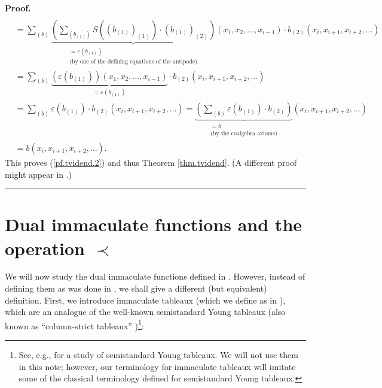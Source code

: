 \documentclass[numbers=enddot,12pt,final,onecolumn,notitlepage,abstracton]{scrartcl}%
\theoremstyle{definition}
\newenvironment{proof}[1][Proof]{\noindent\textbf{#1.} }{\ \rule{0.5em}{0.5em}}
\newenvironment{verlong}{}{}
\newenvironment{noncompile}{}{}
\let\sumnonlimits\sum
\renewcommand{\sum}{\sumnonlimits\limits}
\begin{document}
\begin{verlong}
\begin{noncompile}
\begin{proof}
\begin{align*}
\\
&  =\sum_{\left(  b\right)  }\underbrace{\left(  \sum_{\left(  b_{\left(
1\right)  }\right)  }S\left(  \left(  b_{\left(  1\right)  }\right)  _{\left(
1\right)  }\right)  \cdot\left(  b_{\left(  1\right)  }\right)  _{\left(
2\right)  }\right)  }_{\substack{=\varepsilon\left(  b_{\left(  1\right)
}\right)  \\\text{(by one of the defining equations of the antipode)}}}\left(
x_{1},x_{2},\ldots,x_{i-1}\right)  \cdot b_{\left(  2\right)  }\left(
x_{i},x_{i+1},x_{i+2},\ldots\right) \\
&  =\sum_{\left(  b\right)  }\underbrace{\left(  \varepsilon\left(  b_{\left(
1\right)  }\right)  \right)  \left(  x_{1},x_{2},\ldots,x_{i-1}\right)
}_{=\varepsilon\left(  b_{\left(  1\right)  }\right)  }\cdot b_{\left(
2\right)  }\left(  x_{i},x_{i+1},x_{i+2},\ldots\right) \\
&  =\sum_{\left(  b\right)  }\varepsilon\left(  b_{\left(  1\right)  }\right)
\cdot b_{\left(  2\right)  }\left(  x_{i},x_{i+1},x_{i+2},\ldots\right)
=\underbrace{\left(  \sum_{\left(  b\right)  }\varepsilon\left(  b_{\left(
1\right)  }\right)  \cdot b_{\left(  2\right)  }\right)  }%
_{\substack{=b\\\text{(by the coalgebra axioms)}}}\left(  x_{i},x_{i+1}%
,x_{i+2},\ldots\right) \\
&  =b\left(  x_{i},x_{i+1},x_{i+2},\ldots\right)  .
\end{align*}
This proves (\ref{pf.tvidend.2}) and thus Theorem \ref{thm.tvidend}. (A
different proof might appear in \cite{Gri-gammapart}.)
\end{proof}
\end{noncompile}
\end{verlong}

\section{\label{sect.dualimmac}Dual immaculate functions and the operation
$\left.  \prec\right.  $}

We will now study the dual immaculate functions defined in \cite{BBSSZ}.
However, instead of defining them as was done in \cite[Section 3.7]{BBSSZ}, we
shall give a different (but equivalent) definition. First, we introduce
immaculate tableaux (which we define as in \cite[Definition 3.9]{BBSSZ}),
which are an analogue of the well-known semistandard Young tableaux (also
known as \textquotedblleft column-strict tableaux\textquotedblright%
)\footnote{See, e.g., \cite[Chapter 7]{Stanley-EC2} for a study of
semistandard Young tableaux. We will not use them in this note; however, our
terminology for immaculate tableaux will imitate some of the classical
terminology defined for semistandard Young tableaux.}:
\end{document}
